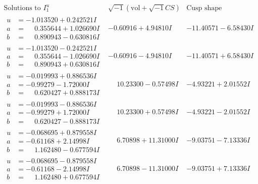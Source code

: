 \documentclass[1p]{elsarticle_modified}
\theoremstyle{definition}
\newcommand{\I}{\sqrt{-1}}
\begin{document}
$$\begin{array}{c|c|c}  
\text{Solutions to }I^u_{1}& \I (\text{vol} + \sqrt{-1}CS) & \text{Cusp shape}\\
 \hline 
\begin{aligned}
u &= -1.013520 + 0.242521 I \\
a &= \phantom{-}0.355644 + 1.026690 I \\
b &= \phantom{-}0.890943 - 0.630816 I\end{aligned}
 & -0.60916 + 4.94810 I & -11.40571 - 6.58430 I \\ \hline\begin{aligned}
u &= -1.013520 - 0.242521 I \\
a &= \phantom{-}0.355644 - 1.026690 I \\
b &= \phantom{-}0.890943 + 0.630816 I\end{aligned}
 & -0.60916 - 4.94810 I & -11.40571 + 6.58430 I \\ \hline\begin{aligned}
u &= -0.019993 + 0.886536 I \\
a &= -0.99279 - 1.72000 I \\
b &= \phantom{-}0.620427 + 0.888173 I\end{aligned}
 & \phantom{-}10.23300 - 0.57498 I & -4.93221 + 2.01552 I \\ \hline\begin{aligned}
u &= -0.019993 - 0.886536 I \\
a &= -0.99279 + 1.72000 I \\
b &= \phantom{-}0.620427 - 0.888173 I\end{aligned}
 & \phantom{-}10.23300 + 0.57498 I & -4.93221 - 2.01552 I \\ \hline\begin{aligned}
u &= -0.068695 + 0.879558 I \\
a &= -0.61168 + 2.14998 I \\
b &= \phantom{-}1.162480 - 0.677594 I\end{aligned}
 & \phantom{-}6.70898 + 11.31000 I & -9.03751 - 7.13336 I \\ \hline\begin{aligned}
u &= -0.068695 - 0.879558 I \\
a &= -0.61168 - 2.14998 I \\
b &= \phantom{-}1.162480 + 0.677594 I\end{aligned}
 & \phantom{-}6.70898 - 11.31000 I & -9.03751 + 7.13336 I \\ \hline\begin{aligned}

\end{aligned}
\end{array}$$
\end{document}
